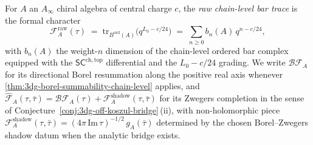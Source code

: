 \begin{definition}\label{def:3dg-F5-raw-trace}%
%
For $A$ an $A_{\infty}$ chiral algebra of central charge $c$, the
\emph{raw chain-level bar trace} is the formal character
\[
 \mathcal F^{\mathrm{raw}}_{A}(\tau)
 \;=\;
 \mathrm{tr}_{B^{\mathrm{ord}}(A)}\!\bigl(q^{L_{0} - c/24}\bigr)
 \;=\;
 \sum_{n \ge 0} b_{n}(A)\, q^{n - c/24},
\]
with $b_{n}(A)$ the weight-$n$ dimension of the chain-level ordered
bar complex equipped with the $\mathsf{SC}^{\mathrm{ch,top}}$
differential and the $L_{0}-c/24$ grading. We write
$\mathcal B\mathcal F_{A}$ for its directional Borel resummation
along the positive real axis whenever
\autoref{thm:3dg-borel-summability-chain-level} applies, and
$\widehat{\mathcal F}_{A}(\tau,\bar\tau)
= \mathcal B\mathcal F_{A}(\tau)
+ \mathcal F^{\mathrm{shadow}}_{A}(\tau,\bar\tau)$
for its Zwegers completion in the sense of
Conjecture~\ref{conj:3dg-off-koszul-bridge}\,\textup{(ii)}, with
non-holomorphic piece
$\mathcal F^{\mathrm{shadow}}_{A}(\tau,\bar\tau)
= (4\pi\,\mathrm{Im}\,\tau)^{-1/2}\, g_{A}(\bar\tau)$ determined by
the chosen Borel--Zwegers shadow datum when the analytic bridge
exists.
\end{definition}


